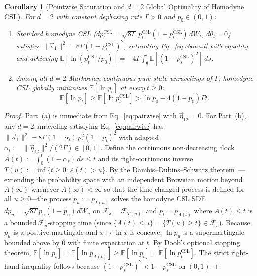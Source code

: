 \documentclass[aps,pra,10pt,twocolumn,superscriptaddress,amsmath,amssymb,floatfix]{revtex4-2}
\newtheorem{corollary}{Corollary}
\newcommand{\E}{\mathbb{E}}
\begin{document}
\begin{corollary}[Pointwise Saturation and $d=2$ Global Optimality of Homodyne CSL]
\label{cor:csl}
For $d=2$ with constant dephasing rate $\Gamma > 0$ and $p_0 \in (0,1)$:
\begin{enumerate}
\item[(a)] Standard homodyne CSL ($dp_t^{\mathrm{CSL}} = \sqrt{8\Gamma}\,p_t^{\mathrm{CSL}}(1-p_t^{\mathrm{CSL}})\,dW_t$, $d\theta_t = 0$) satisfies $\|\vec{v}_1\|^2 = 8\Gamma(1-p_t^{\mathrm{CSL}})^2$, saturating Eq.~\eqref{eq:vbound} with equality and achieving $\E[\ln(p_t^{\mathrm{CSL}}/p_0)] = -4\Gamma\int_0^t \E[(1-p_s^{\mathrm{CSL}})^2]\,ds$.
\item[(b)] Among all $d=2$ Markovian continuous pure-state unravelings of $\Gamma$, homodyne CSL globally minimizes $\E[\ln p_t]$ at every $t \ge 0$:
\begin{equation}
\label{eq:csl_opt}
\E[\ln p_t] \ge \E[\ln p_t^{\mathrm{CSL}}] > \ln p_0 - 4(1-p_0)\Gamma t.
\end{equation}
\end{enumerate}
\end{corollary}

\begin{proof}
Part~(a) is immediate from Eq.~\eqref{eq:pairwise} with $\vec{\eta}_{12} = 0$. For Part~(b), any $d=2$ unraveling satisfying Eq.~\eqref{eq:pairwise} has $\|\vec{\sigma}_1\|^2 = 8\Gamma(1-\alpha_t)\,p_t^2(1-p_t)^2$ with adapted $\alpha_t := \|\vec{\eta}_{12}\|^2/(2\Gamma) \in [0,1]$. Define the continuous non-decreasing clock $A(t) := \int_0^t (1-\alpha_s)\,ds \le t$ and its right-continuous inverse $T(u) := \inf\{t \ge 0 : A(t) > u\}$. By the Dambis--Dubins--Schwarz theorem~\cite{RevuzYor1999}---extending the probability space with an independent Brownian motion beyond $A(\infty)$ whenever $A(\infty)<\infty$ so that the time-changed process is defined for all $u \ge 0$---the process $\tilde{p}_u := p_{T(u)}$ solves the homodyne CSL SDE $d\tilde{p}_u = \sqrt{8\Gamma}\tilde{p}_u(1-\tilde{p}_u)\,d\tilde{W}_u$ on $\tilde{\mathcal{F}}_u = \mathcal{F}_{T(u)}$, and $p_t = \tilde{p}_{A(t)}$ where $A(t) \le t$ is a bounded $\tilde{\mathcal{F}}_u$-stopping time (since $\{A(t)\le u\}=\{T(u)\ge t\}\in\tilde{\mathcal{F}}_u$). Because $\tilde{p}_u$ is a positive martingale and $x \mapsto \ln x$ is concave, $\ln \tilde{p}_u$ is a supermartingale bounded above by $0$ with finite expectation at $t$. By Doob's optional stopping theorem, $\E[\ln p_t] = \E[\ln \tilde{p}_{A(t)}] \ge \E[\ln \tilde{p}_t] = \E[\ln p_t^{\mathrm{CSL}}]$. The strict right-hand inequality follows because $(1-p_s^{\mathrm{CSL}})^2 < 1-p_s^{\mathrm{CSL}}$ on $(0,1)$.
\end{proof}
\end{document}

